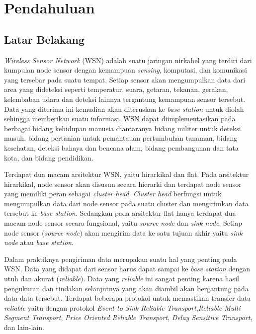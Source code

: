 \chapter{Pendahuluan}
\label{chap:intro}
   
\section{Latar Belakang}
\label{sec:label}

\textit{Wireless Sensor Network} (WSN) adalah suatu jaringan nirkabel yang terdiri dari kumpulan node sensor dengan kemampuan \textit{sensing}, komputasi, dan komunikasi yang tersebar pada suatu tempat. Setiap sensor akan mengumpulkan data dari area yang dideteksi seperti temperatur, suara, getaran, tekanan, gerakan, kelembaban udara dan deteksi lainnya tergantung kemampuan sensor tersebut. Data yang diterima ini kemudian akan diteruskan ke \textit{base station} untuk diolah sehingga memberikan suatu informasi. WSN dapat diimplementasikan pada berbagai bidang kehidupan manusia diantaranya bidang militer untuk deteksi musuh, bidang pertanian untuk pemantauan pertumbuhan tanaman, bidang kesehatan, deteksi bahaya dan bencana alam, bidang pembangunan dan tata kota, dan bidang pendidikan.

Terdapat dua macam arsitektur WSN, yaitu hirarkikal dan flat. Pada arsitektur hirarkikal, node sensor akan disusun secara hierarki dan terdapat node sensor yang memiliki peran sebagai \textit{cluster head}. \textit{Cluster head} berfungsi untuk mengumpulkan data dari node sensor pada suatu cluster dan mengirimkan data tersebut ke \textit{base station}. Sedangkan pada arsitektur flat hanya terdapat dua macam node sensor secara fungsional, yaitu \textit{source node} dan \textit{sink node}. Setiap node sensor (\textit{source node}) akan mengirim data ke satu tujuan akhir yaitu \textit{sink node} atau \textit{base station}.

Dalam praktiknya pengiriman data merupakan suatu hal yang penting pada WSN. Data yang didapat dari sensor harus dapat sampai ke \textit{base station} dengan utuh dan akurat (\textit{reliable}). Data yang \textit{reliable} ini sangat penting karena hasil pengukuran dan tindakan selanjutnya yang akan diambil akan bergantung pada data-data tersebut. Terdapat beberapa protokol untuk memastikan transfer data \textit{reliable} yaitu dengan protokol \textit{Event to Sink Reliable Transport},\textit{Reliable Multi Segment Transport}, \textit{Price Oriented Reliable Transport}, \textit{Delay Sensitive Transport}, dan lain-lain.

